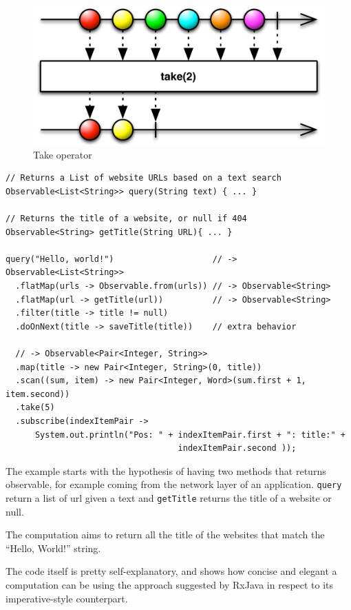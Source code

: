 \begin{figure}[htbp]
\centering
\includegraphics[scale=0.5]{imgs/take.png}
\caption{Take operator}
\end{figure}

\label{a-complex-example}

\begin{verbatim}
// Returns a List of website URLs based on a text search
Observable<List<String>> query(String text) { ... }

// Returns the title of a website, or null if 404
Observable<String> getTitle(String URL){ ... }

query("Hello, world!")                    // -> Observable<List<String>>
  .flatMap(urls -> Observable.from(urls)) // -> Observable<String>
  .flatMap(url -> getTitle(url))          // -> Observable<String>
  .filter(title -> title != null)
  .doOnNext(title -> saveTitle(title))    // extra behavior
  
  // -> Observable<Pair<Integer, String>>
  .map(title -> new Pair<Integer, String>(0, title)) 
  .scan((sum, item) -> new Pair<Integer, Word>(sum.first + 1, item.second))
  .take(5)
  .subscribe(indexItemPair ->
      System.out.println("Pos: " + indexItemPair.first + ": title:" + 
      							   indexItemPair.second ));
\end{verbatim}

The example starts with the hypothesis of having two methods that
returns observable, for example coming from the network layer of an
application. \texttt{query} return a list of url given a text and
\texttt{getTitle} returns the title of a website or null.

The computation aims to return all the title of the websites that match
the ``Hello, World!'' string.

The code itself is pretty self-explanatory, and shows how concise and
elegant a computation can be using the approach suggested by RxJava in
respect to its imperative-style counterpart.

